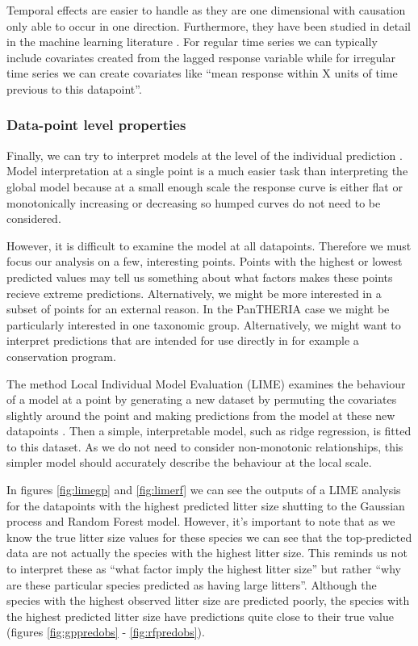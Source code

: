 \documentclass[10pt,]{article}
\begin{document}
Temporal effects are easier to handle as they are one dimensional with causation only able to occur in one direction. Furthermore, they have been studied in detail in the machine learning literature \citep{jeong2008non}. For regular time series we can typically include covariates created from the lagged response variable while for irregular time series we can create covariates like ``mean response within X units of time previous to this datapoint''.

\subsubsection{Data-point level properties}\label{data-point-level-properties}

Finally, we can try to interpret models at the level of the individual prediction \citep{lime, ribeiro2016should, lundberg2017unified, ribeiro2016nothing}. Model interpretation at a single point is a much easier task than interpreting the global model because at a small enough scale the response curve is either flat or monotonically increasing or decreasing so humped curves do not need to be considered.

However, it is difficult to examine the model at all datapoints. Therefore we must focus our analysis on a few, interesting points. Points with the highest or lowest predicted values may tell us something about what factors makes these points recieve extreme predictions. Alternatively, we might be more interested in a subset of points for an external reason. In the PanTHERIA case we might be particularly interested in one taxonomic group. Alternatively, we might want to interpret predictions that are intended for use directly in for example a conservation program.

The method Local Individual Model Evaluation (LIME) examines the behaviour of a model at a point by generating a new dataset by permuting the covariates slightly around the point and making predictions from the model at these new datapoints \citep{lime, ribeiro2016should, lundberg2017unified, ribeiro2016nothing}. Then a simple, interpretable model, such as ridge regression, is fitted to this dataset. As we do not need to consider non-monotonic relationships, this simpler model should accurately describe the behaviour at the local scale.

In figures \ref{fig:limegp} and \ref{fig:limerf} we can see the outputs of a LIME analysis for the datapoints with the highest predicted litter size shutting to the Gaussian process and Random Forest model. However, it's important to note that as we know the true litter size values for these species we can see that the top-predicted data are not actually the species with the highest litter size. This reminds us not to interpret these as ``what factor imply the highest litter size'' but rather ``why are these particular species predicted as having large litters''. Although the species with the highest observed litter size are predicted poorly, the species with the highest predicted litter size have predictions quite close to their true value (figures \ref{fig:gppredobs} - \ref{fig:rfpredobs}).
\end{document}
